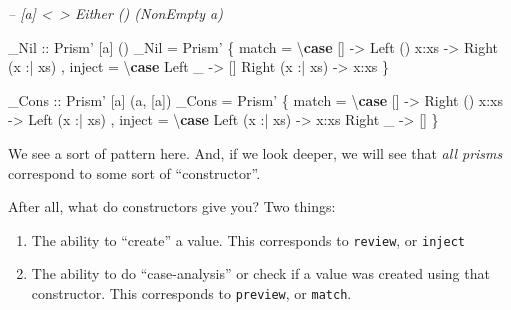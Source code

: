 \documentclass[]{article}
\newenvironment{Shaded}{}{}
\newcommand{\CommentTok}[1]{\textcolor[rgb]{0.38,0.63,0.69}{\textit{#1}}}
\newcommand{\DataTypeTok}[1]{\textcolor[rgb]{0.56,0.13,0.00}{#1}}
\newcommand{\FunctionTok}[1]{\textcolor[rgb]{0.02,0.16,0.49}{#1}}
\newcommand{\KeywordTok}[1]{\textcolor[rgb]{0.00,0.44,0.13}{\textbf{#1}}}
\newcommand{\NormalTok}[1]{#1}
\newcommand{\OtherTok}[1]{\textcolor[rgb]{0.00,0.44,0.13}{#1}}
\begin{document}
\begin{Shaded}
\begin{Highlighting}[]
\CommentTok{-- [a] <~> Either () (NonEmpty a)}

\OtherTok{_Nil ::} \DataTypeTok{Prism'}\NormalTok{ [a] ()}
\NormalTok{_Nil }\FunctionTok{=} \DataTypeTok{Prism'}
\NormalTok{    \{ match  }\FunctionTok{=}\NormalTok{ \textbackslash{}}\KeywordTok{case}\NormalTok{ []              }\OtherTok{->} \DataTypeTok{Left}\NormalTok{ ()}
\NormalTok{                     x}\FunctionTok{:}\NormalTok{xs            }\OtherTok{->} \DataTypeTok{Right}\NormalTok{ (x }\FunctionTok{:|}\NormalTok{ xs)}
\NormalTok{    , inject }\FunctionTok{=}\NormalTok{ \textbackslash{}}\KeywordTok{case} \DataTypeTok{Left}\NormalTok{ _          }\OtherTok{->}\NormalTok{ []}
                     \DataTypeTok{Right}\NormalTok{ (x }\FunctionTok{:|}\NormalTok{ xs) }\OtherTok{->}\NormalTok{ x}\FunctionTok{:}\NormalTok{xs}
\NormalTok{    \}}

\OtherTok{_Cons ::} \DataTypeTok{Prism'}\NormalTok{ [a] (a, [a])}
\NormalTok{_Cons }\FunctionTok{=} \DataTypeTok{Prism'}
\NormalTok{    \{ match  }\FunctionTok{=}\NormalTok{ \textbackslash{}}\KeywordTok{case}\NormalTok{ []              }\OtherTok{->} \DataTypeTok{Right}\NormalTok{ ()}
\NormalTok{                     x}\FunctionTok{:}\NormalTok{xs            }\OtherTok{->} \DataTypeTok{Left}\NormalTok{ (x }\FunctionTok{:|}\NormalTok{ xs)}
\NormalTok{    , inject }\FunctionTok{=}\NormalTok{ \textbackslash{}}\KeywordTok{case} \DataTypeTok{Left}\NormalTok{  (x }\FunctionTok{:|}\NormalTok{ xs) }\OtherTok{->}\NormalTok{ x}\FunctionTok{:}\NormalTok{xs}
                     \DataTypeTok{Right}\NormalTok{ _         }\OtherTok{->}\NormalTok{ []}
\NormalTok{    \}}
\end{Highlighting}
\end{Shaded}

We see a sort of pattern here. And, if we look deeper, we will see that
\emph{all prisms} correspond to some sort of ``constructor''.

After all, what do constructors give you? Two things:

\begin{enumerate}
\def\labelenumi{\arabic{enumi}.}
\tightlist
\item
  The ability to ``create'' a value. This corresponds to \texttt{review}, or
  \texttt{inject}
\item
  The ability to do ``case-analysis'' or check if a value was created using that
  constructor. This corresponds to \texttt{preview}, or \texttt{match}.
\end{enumerate}
\end{document}
